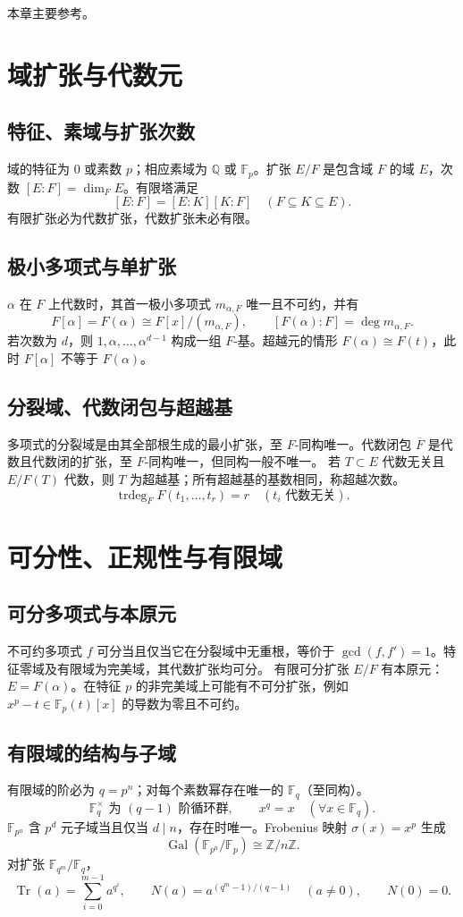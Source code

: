 \documentclass[../main.tex]{subfiles}
\begin{document}
本章主要参考\cite{milneFT}。

\section{域扩张与代数元}
\subsection{特征、素域与扩张次数}
域的特征为 $0$ 或素数 $p$；相应素域为 $\mathbb Q$ 或 $\mathbb F_p$。扩张 $E/F$ 是包含域 $F$ 的域 $E$，次数 $[E:F]=\dim_FE$。有限塔满足
\[
[E:F]=[E:K][K:F]\quad(F\subseteq K\subseteq E).
\]
有限扩张必为代数扩张，代数扩张未必有限。
\subsection{极小多项式与单扩张}
$\alpha$ 在 $F$ 上代数时，其首一极小多项式 $m_{\alpha,F}$ 唯一且不可约，并有
\[
F[\alpha]=F(\alpha)\cong F[x]/(m_{\alpha,F}),\qquad
[F(\alpha):F]=\deg m_{\alpha,F}.
\]
若次数为 $d$，则 $1,\alpha,\ldots,\alpha^{d-1}$ 构成一组 $F$-基。超越元的情形 $F(\alpha)\cong F(t)$，此时 $F[\alpha]$ 不等于 $F(\alpha)$。
\subsection{分裂域、代数闭包与超越基}
多项式的分裂域是由其全部根生成的最小扩张，至 $F$-同构唯一。代数闭包 $\overline F$ 是代数且代数闭的扩张，至 $F$-同构唯一，但同构一般不唯一。
若 $T\subset E$ 代数无关且 $E/F(T)$ 代数，则 $T$ 为超越基；所有超越基的基数相同，称超越次数。
\[
\operatorname{trdeg}_F F(t_1,\ldots,t_r)=r
\quad(t_i\text{ 代数无关}).
\]
\section{可分性、正规性与有限域}
\subsection{可分多项式与本原元}
不可约多项式 $f$ 可分当且仅当它在分裂域中无重根，等价于 $\gcd(f,f')=1$。特征零域及有限域为完美域，其代数扩张均可分。
有限可分扩张 $E/F$ 有本原元：$E=F(\alpha)$。在特征 $p$ 的非完美域上可能有不可分扩张，例如 $x^p-t\in\mathbb F_p(t)[x]$ 的导数为零且不可约。
\subsection{有限域的结构与子域}
有限域的阶必为 $q=p^n$；对每个素数幂存在唯一的 $\mathbb F_q$（至同构）。
\[
\mathbb F_q^\times\text{ 为 }(q-1)\text{ 阶循环群},\qquad
x^q=x\quad(\forall x\in\mathbb F_q).
\]
$\mathbb F_{p^n}$ 含 $p^d$ 元子域当且仅当 $d\mid n$，存在时唯一。Frobenius 映射 $\sigma(x)=x^p$ 生成
\[
\operatorname{Gal}(\mathbb F_{p^n}/\mathbb F_p)\cong\mathbb Z/n\mathbb Z.
\]
对扩张 $\mathbb F_{q^m}/\mathbb F_q$，
\[
\operatorname{Tr}(a)=\sum_{i=0}^{m-1}a^{q^i},\qquad
N(a)=a^{(q^m-1)/(q-1)}\quad(a\ne0),\qquad N(0)=0.
\]
\end{document}
